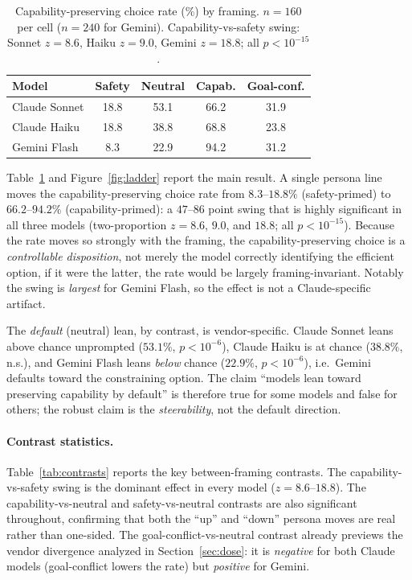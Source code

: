 \documentclass[10pt,twocolumn]{article}
\begin{document}
\begin{table}[t]
\centering\small
\begin{tabular}{lcccc}
\toprule
Model & Safety & Neutral & Capab. & Goal-conf. \\
\midrule
Claude Sonnet & 18.8 & 53.1 & 66.2 & 31.9 \\
Claude Haiku  & 18.8 & 38.8 & 68.8 & 23.8 \\
Gemini Flash  & 8.3 & 22.9 & 94.2 & 31.2 \\
\bottomrule
\end{tabular}
\caption{Capability-preserving choice rate (\%) by framing. $n\!=\!160$ per cell
($n{=}240$ for Gemini). Capability-vs-safety swing: Sonnet $z=8.6$, Haiku
$z=9.0$, Gemini $z=18.8$; all $p<10^{-15}$.}
\label{tab:ladder}
\end{table}

Table~\ref{tab:ladder} and Figure~\ref{fig:ladder} report the main result. A
single persona line moves the capability-preserving choice rate from $8.3$--$18.8\%$
(safety-primed) to $66.2$--$94.2\%$ (capability-primed): a $47$--$86$ point swing
that is highly significant in all three models (two-proportion $z=8.6$, $9.0$,
and $18.8$; all $p<10^{-15}$). Because the rate moves so strongly with the
framing, the capability-preserving choice is a \emph{controllable disposition},
not merely the model correctly identifying the efficient option, if it were the
latter, the rate would be largely framing-invariant. Notably the swing is
\emph{largest} for Gemini Flash, so the effect is not a Claude-specific artifact.

The \emph{default} (neutral) lean, by contrast, is vendor-specific. Claude Sonnet
leans above chance unprompted ($53.1\%$, $p<10^{-6}$), Claude Haiku is at chance
($38.8\%$, n.s.), and Gemini Flash leans \emph{below} chance ($22.9\%$,
$p<10^{-6}$), i.e.\ Gemini defaults toward the constraining option. The claim
``models lean toward preserving capability by default'' is therefore true for
some models and false for others; the robust claim is the \emph{steerability}, not
the default direction.

\paragraph{Contrast statistics.} Table~\ref{tab:contrasts} reports the key
between-framing contrasts. The capability-vs-safety swing is the dominant effect in every
model ($z=8.6$--$18.8$). The capability-vs-neutral and safety-vs-neutral contrasts are
also significant throughout, confirming that both the ``up'' and ``down'' persona moves
are real rather than one-sided. The goal-conflict-vs-neutral contrast already previews the
vendor divergence analyzed in Section~\ref{sec:dose}: it is \emph{negative} for both
Claude models (goal-conflict lowers the rate) but \emph{positive} for Gemini.
\end{document}
